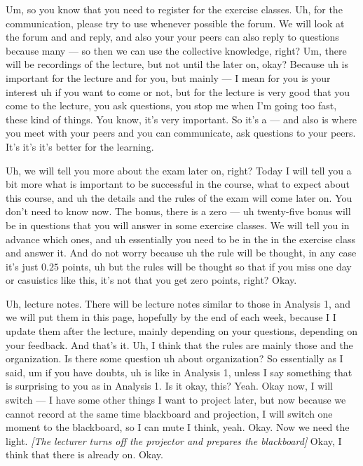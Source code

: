 \begin{spoken-clean}[00:01:07 - 00:02:55]
Um, so you know that you need to register for the exercise classes. Uh, for the communication, please try to use whenever possible the forum. We will look at the forum and and reply, and also your your peers can also reply to questions because many --- so then we can use the collective knowledge, right? Um, there will be recordings of the lecture, but not until the later on, okay? Because uh is important for the lecture and for you, but mainly --- I mean for you is your interest uh if you want to come or not, but for the lecture is very good that you come to the lecture, you ask questions, you stop me when I'm going too fast, these kind of things. You know, it's very important. So it's a --- and also is where you meet with your peers and you can communicate, ask questions to your peers. It's it's it's better for the learning.

Uh, we will tell you more about the exam later on, right? Today I will tell you a bit more what is important to be successful in the course, what to expect about this course, and uh the details and the rules of the exam will come later on. You don't need to know now. The bonus, there is a zero --- uh twenty-five bonus will be in questions that you will answer in some exercise classes. We will tell you in advance which ones, and uh essentially you need to be in the in the exercise class and answer it. And do not worry because uh the rule will be thought, in any case it's just $0.25$ points, uh but the rules will be thought so that if you miss one day or casuistics like this, it's not that you get zero points, right? Okay.
\end{spoken-clean}

\begin{spoken-clean}[00:02:55 - 00:04:15]
Uh, lecture notes. There will be lecture notes similar to those in Analysis 1, and we will put them in this page, hopefully by the end of each week, because I I update them after the lecture, mainly depending on your questions, depending on your feedback. And that's it. Uh, I think that the rules are mainly those and the organization. Is there some question uh about organization? So essentially as I said, um if you have doubts, uh is like in Analysis 1, unless I say something that is surprising to you as in Analysis 1. Is it okay, this? Yeah. Okay now, I will switch --- I have some other things I want to project later, but now because we cannot record at the same time blackboard and projection, I will switch one moment to the blackboard, so I can mute I think, yeah. Okay. Now we need the light. \textit{[The lecturer turns off the projector and prepares the blackboard]} Okay, I think that there is already on. Okay.
\end{spoken-clean}

